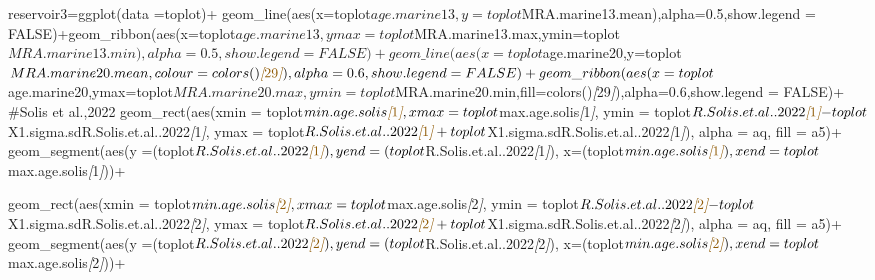 \documentclass[
]{article}
\newenvironment{Shaded}{\begin{snugshade}}{\end{snugshade}}
\newcommand{\CommentTok}[1]{\textcolor[rgb]{0.56,0.35,0.01}{\textit{#1}}}
\newcommand{\NormalTok}[1]{#1}
\newcommand{\OtherTok}[1]{\textcolor[rgb]{0.56,0.35,0.01}{#1}}
\begin{document}
\begin{Shaded}
\begin{Highlighting}[]
\NormalTok{reservoir3=ggplot(data =toplot)+}
\NormalTok{  geom\_line(aes(x=toplot$age.marine13,y=toplot$MRA.marine13.mean),alpha=0.5,show.legend = FALSE)+geom\_ribbon(aes(x=toplot$age.marine13,ymax=toplot$MRA.marine13.max,ymin=toplot$MRA.marine13.min),alpha=0.5,show.legend = FALSE)+}
\NormalTok{  geom\_line(aes(x=toplot$age.marine20,y=toplot$MRA.marine20.mean,colour=colors()}\CommentTok{[}\OtherTok{29}\CommentTok{]}\NormalTok{),alpha=0.6,show.legend = FALSE)+geom\_ribbon(aes(x=toplot$age.marine20,ymax=toplot$MRA.marine20.max,ymin=toplot$MRA.marine20.min,fill=colors()}\CommentTok{[}\OtherTok{29}\CommentTok{]}\NormalTok{),alpha=0.6,show.legend = FALSE)+  }
\NormalTok{  \#Solis et al.,2022}
\NormalTok{  geom\_rect(aes(xmin = toplot$min.age.solis}\CommentTok{[}\OtherTok{1}\CommentTok{]}\NormalTok{, }
\NormalTok{                xmax = toplot$max.age.solis}\CommentTok{[}\OtherTok{1}\CommentTok{]}\NormalTok{, }
\NormalTok{                ymin = toplot$R.Solis.et.al..2022}\CommentTok{[}\OtherTok{1}\CommentTok{]}\NormalTok{{-}toplot$X1.sigma.sdR.Solis.et.al..2022}\CommentTok{[}\OtherTok{1}\CommentTok{]}\NormalTok{,}
\NormalTok{                ymax = toplot$R.Solis.et.al..2022}\CommentTok{[}\OtherTok{1}\CommentTok{]}\NormalTok{+toplot$X1.sigma.sdR.Solis.et.al..2022}\CommentTok{[}\OtherTok{1}\CommentTok{]}\NormalTok{),}
\NormalTok{            alpha = aq,}
\NormalTok{            fill = a5)+}
\NormalTok{  geom\_segment(aes(y =(toplot$R.Solis.et.al..2022}\CommentTok{[}\OtherTok{1}\CommentTok{]}\NormalTok{),}
\NormalTok{                   yend =(toplot$R.Solis.et.al..2022}\CommentTok{[}\OtherTok{1}\CommentTok{]}\NormalTok{),}
\NormalTok{                   x=(toplot$min.age.solis}\CommentTok{[}\OtherTok{1}\CommentTok{]}\NormalTok{),}
\NormalTok{                   xend=toplot$max.age.solis}\CommentTok{[}\OtherTok{1}\CommentTok{]}\NormalTok{))+}
  
\NormalTok{  geom\_rect(aes(xmin = toplot$min.age.solis}\CommentTok{[}\OtherTok{2}\CommentTok{]}\NormalTok{, }
\NormalTok{                xmax = toplot$max.age.solis}\CommentTok{[}\OtherTok{2}\CommentTok{]}\NormalTok{, }
\NormalTok{                ymin = toplot$R.Solis.et.al..2022}\CommentTok{[}\OtherTok{2}\CommentTok{]}\NormalTok{{-}toplot$X1.sigma.sdR.Solis.et.al..2022}\CommentTok{[}\OtherTok{2}\CommentTok{]}\NormalTok{,}
\NormalTok{                ymax = toplot$R.Solis.et.al..2022}\CommentTok{[}\OtherTok{2}\CommentTok{]}\NormalTok{+toplot$X1.sigma.sdR.Solis.et.al..2022}\CommentTok{[}\OtherTok{2}\CommentTok{]}\NormalTok{),}
\NormalTok{            alpha = aq,}
\NormalTok{            fill = a5)+}
\NormalTok{  geom\_segment(aes(y =(toplot$R.Solis.et.al..2022}\CommentTok{[}\OtherTok{2}\CommentTok{]}\NormalTok{),}
\NormalTok{                   yend =(toplot$R.Solis.et.al..2022}\CommentTok{[}\OtherTok{2}\CommentTok{]}\NormalTok{),}
\NormalTok{                   x=(toplot$min.age.solis}\CommentTok{[}\OtherTok{2}\CommentTok{]}\NormalTok{),}
\NormalTok{                   xend=toplot$max.age.solis}\CommentTok{[}\OtherTok{2}\CommentTok{]}\NormalTok{))+}
  

\end{Highlighting}
\end{Shaded}
\end{document}

